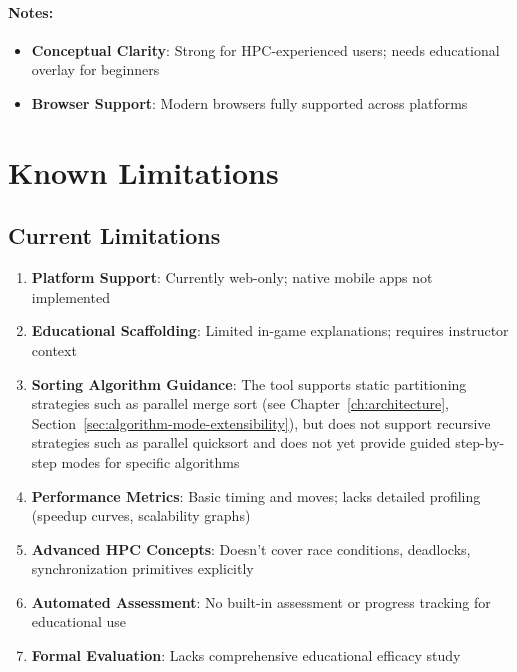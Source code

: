 \paragraph*{Notes:}

\begin{itemize}
    \item \textbf{Conceptual Clarity}: Strong for HPC-experienced users; needs educational overlay for beginners

    \item \textbf{Browser Support}: Modern browsers fully supported across platforms
\end{itemize}

\section{Known Limitations}
\label{sec:limitations}

\subsection{Current Limitations}
\label{subsec:current-limitations}

\begin{enumerate}
    \item \textbf{Platform Support}: Currently web-only; native mobile apps not implemented

    \item \textbf{Educational Scaffolding}: Limited in-game explanations; requires instructor context

    \item \textbf{Sorting Algorithm Guidance}: The tool supports static partitioning strategies such as parallel merge sort (see Chapter~\ref{ch:architecture}, Section~\ref{sec:algorithm-mode-extensibility}), but does not support recursive strategies such as parallel quicksort and does not yet provide guided step-by-step modes for specific algorithms

    \item \textbf{Performance Metrics}: Basic timing and moves; lacks detailed profiling (speedup curves, scalability graphs)

    \item \textbf{Advanced HPC Concepts}: Doesn't cover race conditions, deadlocks, synchronization primitives explicitly

    \item \textbf{Automated Assessment}: No built-in assessment or progress tracking for educational use

    \item \textbf{Formal Evaluation}: Lacks comprehensive educational efficacy study
\end{enumerate}

